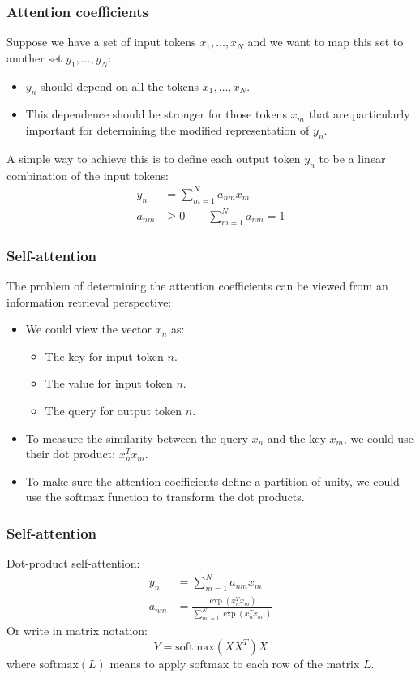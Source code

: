 \documentclass{beamer}
\begin{document}
\begin{frame}
    \frametitle{Attention coefficients}
    Suppose we have a set of input tokens $x_{1},\hdots,x_{N}$ and we want to map this set to another set $y_{1},\hdots,y_{N}$:
    \begin{itemize}
        \item $y_{n}$ should depend on all the tokens $x_{1},\hdots,x_{N}$.
        \item This dependence should be stronger for those tokens $x_{m}$ that are particularly important for determining the modified representation of $y_{n}$.
    \end{itemize}
    A simple way to achieve this is to define each output token $y_{n}$ to be a linear combination of the input tokens:
    \begin{align*}
        y_{n}&=\sum_{m=1}^{N}a_{nm}x_{m} \\
        a_{nm}&\ge{}0\qquad\sum_{m=1}^{N}a_{nm}=1
    \end{align*}
\end{frame}

\begin{frame}
    \frametitle{Self-attention}
    The problem of determining the attention coefficients can be viewed from an information retrieval perspective:
    \begin{itemize}
        \item We could view the vector $x_{n}$ as:
        \begin{itemize}
            \item The key for input token $n$.
            \item The value for input token $n$.
            \item The query for output token $n$.
        \end{itemize}
        \item To measure the similarity between the query $x_{n}$ and the key $x_{m}$, we could use their dot product: $x_{n}^{T}x_{m}$.
        \item To make sure the attention coefficients define a partition of unity, we could use the $\mathrm{softmax}$ function to transform the dot products.
    \end{itemize}
\end{frame}

\begin{frame}
    \frametitle{Self-attention}
    Dot-product self-attention:
    \begin{align*}
        y_{n}&=\sum_{m=1}^{N}a_{nm}x_{m} \\
        a_{nm}&=\frac{\exp(x_{n}^{T}x_{m})}{\sum_{m'=1}^{N}\exp(x_{n}^{T}x_{m'})}
    \end{align*}
    Or write in matrix notation:
    \begin{equation*}
        Y=\mathrm{softmax}(XX^{T})X
    \end{equation*}
    where $\mathrm{softmax}(L)$ means to apply $\mathrm{softmax}$ to each row of the matrix $L$.
\end{frame}
\end{document}
